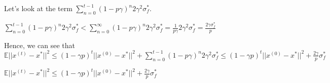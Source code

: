Let's look at the term $\sum_{n=0}^{t - 1} (1 - p\gamma)^n 2\gamma^2 \sigma_f^*$. 

$\sum_{n=0}^{t - 1} (1 - p\gamma)^n 2\gamma^2 \sigma_f^* < \sum_{n=0}^{\infty} (1 - p\gamma)^n 2\gamma^2 \sigma_f^* = \frac{1}{p\gamma} 2\gamma^2 \sigma_f^* = \frac{2\gamma \sigma_f^*}{p}$

Hence, we can see that \newline 
$\mathbb{E}||x^{(t)} - x^*||^2 \leq (1 - \gamma p)^t ||x^{(0)} - x^*||^2 + \sum_{n=0}^{t - 1} (1 - p\gamma)^n 2\gamma^2 \sigma_f^* \leq (1 - \gamma p)^t ||x^{(0)} - x^*||^2 + \frac{2 \gamma}{p} \sigma_f^*$

$\mathbb{E}||x^{(t)} - x^*||^2 \leq (1 - \gamma p)^t ||x^{(0)} - x^*||^2 + \frac{2 \gamma}{p} \sigma_f^*$
